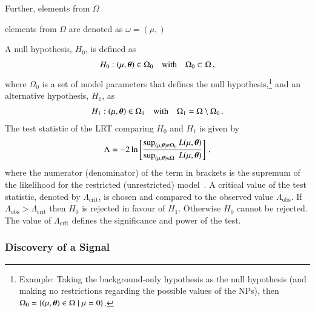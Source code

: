 Further, elements from $\Omega$


elements from $\Omega$ are denoted as $\omega = (\mu, )$


A null hypothesis, $H_0$, is defined as
\begin{align*}
  H_0: (\mu, \myvec{\theta}) \in \Omega_0
  \quad \text{with} \quad \Omega_0 \subset \Omega \,\text{,}
\end{align*}
where $\Omega_0$ is a set of model parameters that defines the null
hypothesis,\footnote{Example: Taking the background-only hypothesis as the null
  hypothesis (and making no restrictions regarding the possible values of the
  NPs), then $\Omega_0 = \{ (\mu, \myvec{\theta}) \in \Omega \mid \mu = 0 \}$.}
and an alternative hypothesis, $H_1$, as
\begin{align*}
  H_1: (\mu, \myvec{\theta}) \in \Omega_1
  \quad \text{with} \quad \Omega_1 = \Omega \setminus \Omega_0 \,\text{.}
\end{align*}
The test statistic of the LRT comparing $H_0$ and $H_1$ is given by
\begin{align*}
  \Lambda = -2 \ln \left[
  \frac{\sup_{(\mu, \myvec{\theta}) \in \Omega_0} L(\mu, \myvec{\theta})}
  {\sup_{(\mu, \myvec{\theta}) \in \Omega\phantom{_0}} L(\mu, \myvec{\theta})}
  \right] \,\text{,}
\end{align*}
where the numerator (denominator) of the term in brackets is the supremum of the
likelihood for the restricted (unrestricted) model~\cite{casella2001}. A
critical value of the test statistic, denoted by $\Lambda_{\text{crit}}$, is
chosen and compared to the observed value $\Lambda_{\text{obs}}$. If
$\Lambda_{\text{obs}} > \Lambda_{\text{crit}}$ then $H_0$ is rejected in favour
of $H_1$. Otherwise $H_0$ cannot be rejected. The value of
$\Lambda_{\text{crit}}$ defines the significance and power of the test.


\subsubsection{Discovery of a Signal}

